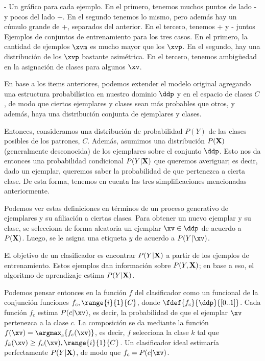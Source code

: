 - Un gráfico para cada ejemplo. En el primero, tenemos muchos puntos de lado - y pocos del lado +. En el segundo tenemos lo mismo, pero además hay un cúmulo grande de +, separados del anterior. En el tercero, tenemos + y - juntos
Ejemplos de conjuntos de entrenamiento para los tres casos. En el primero, la cantidad de ejemplos $\xvm$ es mucho mayor que los $\xvp$. En el segundo, hay una distribución de los $\xvp$ bastante asimétrica. En el tercero, tenemos ambigüedad en la asignación de clases para algunos $\xv$.

En base a los items anteriores, podemos extender el modelo original agregando una estructura probabilística en nuestro dominio $\ddp$ y en el espacio de clases $C$, de modo que ciertos ejemplares y clases sean más probables que otros, y además, haya una distribución conjunta de ejemplares y clases. 

Entonces, consideramos una distribución de probabilidad $P(Y)$ de las clases posibles de los patrones, $C$. Además, asumimos una distribución $P(\mathbf{X})$ (generalmente desconocida) de los ejemplares sobre el conjunto $\ddp$. Esto nos da entonces una probabilidad condicional $P(Y | \mathbf{X} )$ que queremos averiguar; es decir, dado un ejemplar, queremos saber la probabilidad de que pertenezca a cierta clase. De esta forma, tenemos en cuenta las tres simplificaciones mencionadas anteriormente.

Podemos ver estas definiciones en términos de un proceso generativo de ejemplares y su afiliación a ciertas clases. Para obtener un nuevo ejemplar y su clase, se selecciona de forma aleatoria un ejemplar $\xv \in \ddp$ de acuerdo a $P(\mathbf{X})$. Luego, se le asigna una etiqueta $y$ de acuerdo a $P( Y | \xv )$.

El objetivo de un clasificador es encontrar $P( Y | \mathbf{X})$ a partir de los ejemplos de entrenamiento. Estos ejemplos dan información sobre $P(Y, \mathbf{X})$; en base a eso, el algoritmo de aprendizaje estima $P( Y | \mathbf{X})$. 

Podemos pensar entonces en la función $f$ del clasificador como un funcional de la conjunción funciones $f_c, \range{i}{1}{C}$, donde $\fdef{f_c}{\ddp}{[0..1]}$. Cada función $f_c$ estima $P(c| \xv)$, es decir, la probabilidad de que el ejemplar $\xv$ pertenezca a la clase $c$. La composición se da mediante la función $f(\xv) =  \argmax_c \{ f_c(\xv) \} $, es decir, $f$ selecciona la clase $k$ tal que $f_k(\xv) \geq f_c(\xv), \range{i}{1}{C}$. Un clasificador ideal estimaría perfectamente $P(Y|\mathbf{X})$, de modo que $f_c=P(c|\xv)$.

